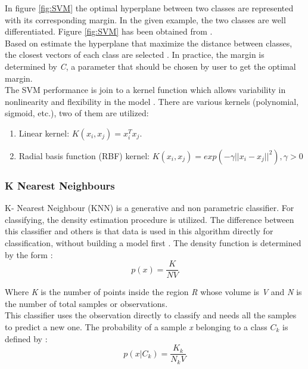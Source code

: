 In figure \ref{fig:SVM} the optimal hyperplane between two classes are represented with its corresponding margin. In the given example, the two classes are well differentiated. Figure \ref{fig:SVM} has been obtained from \cite{SVMimage}.\\

Based on estimate the hyperplane that maximize the distance between classes, the closest vectors of each class are selected \cite{SVM1, MachineLearning}. In practice, the margin is determined by \textit{C}, a parameter that should be chosen by user to get the optimal margin.\\

The SVM performance is join to a kernel function which allows variability in nonlinearity and flexibility in the model \cite{ClassifiersReview, practicalguideSVM}. There are various kernels (polynomial, sigmoid, etc.), two of them are utilized:

\begin{enumerate}
\item Linear kernel: $ K(x_{i},x_{j}) = x_i^T x_j$.
\item Radial basis function (RBF) kernel: $K(x_{i},x_{j}) = exp(-\gamma||x_i-x_j||^2), \gamma>0$
\end{enumerate}

\subsubsection{K Nearest Neighbours}
K- Nearest Neighbour (KNN) is a generative and non parametric classifier. For classifying, the density estimation procedure is utilized. The difference between this classifier and others is that data is used in this algorithm directly for classification, without building a model first \cite{ClassifiersReview}. The density function is determined by the form \cite{MachineLearning}:
\begin{equation}
p(x) = \frac{K}{N V}
\end{equation}

Where \textit{K} is the number of points inside the region \textit{R} whose volume is \textit{V} and \textit{N} is the number of total samples or observations.\\

This classifier uses the observation directly to classify and needs all the samples to predict a new one. The probability of a sample \textit{x} belonging to a class \textit{$C_k$} is defined by \cite{MachineLearning}:
\begin{equation}
p(x|C_k) = \frac{K_k}{N_k V}
\end{equation}

